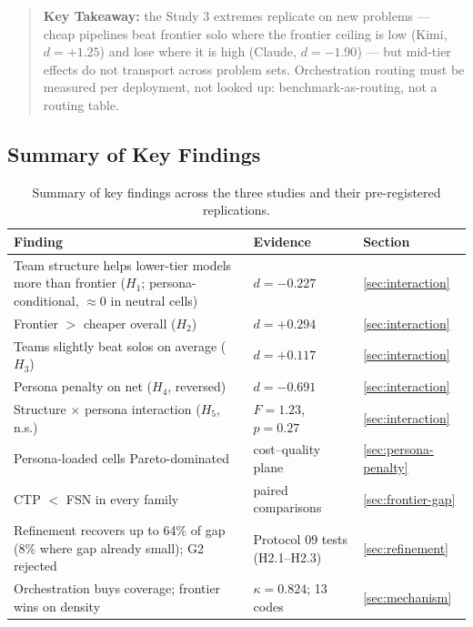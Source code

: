 \documentclass[12pt,a4paper]{article}
\begin{document}
\begin{quote}
\textbf{Key Takeaway:} the Study 3 extremes replicate on new problems ---
cheap pipelines beat frontier solo where the frontier ceiling is low (Kimi,
$d = +1.25$) and lose where it is high (Claude, $d = -1.90$) --- but
mid-tier effects do not transport across problem sets. Orchestration routing
must be measured per deployment, not looked up: benchmark-as-routing, not a
routing table.
\end{quote}

\subsection{Summary of Key Findings}

\begin{table}[ht]
  \centering
  \footnotesize
  \caption{Summary of key findings across the three studies and their
  pre-registered replications.}
  \label{tab:summary-findings}
  \begin{tabular}{@{}>{\raggedright\arraybackslash}p{7.6cm} >{\raggedright\arraybackslash}p{4.6cm} >{\raggedright\arraybackslash}p{2.2cm}@{}}
    \toprule
    \textbf{Finding} & \textbf{Evidence} & \textbf{Section} \\
    \midrule
    Team structure helps lower-tier models more than frontier ($H_1$; persona-conditional, $\approx 0$ in neutral cells) & $d = -0.227$ & \cref{sec:interaction} \\
    Frontier $>$ cheaper overall ($H_2$) & $d = +0.294$ & \cref{sec:interaction} \\
    Teams slightly beat solos on average ($H_3$) & $d = +0.117$ & \cref{sec:interaction} \\
    Persona penalty on net ($H_4$, reversed) & $d = -0.691$ & \cref{sec:interaction} \\
    Structure $\times$ persona interaction ($H_5$, n.s.) & $F = 1.23$, $p = 0.27$ & \cref{sec:interaction} \\
    Persona-loaded cells Pareto-dominated & cost--quality plane & \cref{sec:persona-penalty} \\
    CTP $<$ FSN in every family & paired comparisons & \cref{sec:frontier-gap} \\
    Refinement recovers up to 64\% of gap (8\% where gap already small); G2 rejected & Protocol 09 tests (H2.1--H2.3) & \cref{sec:refinement} \\
    Orchestration buys coverage; frontier wins on density & $\kappa = 0.824$; 13 codes & \cref{sec:mechanism} \\

\end{tabular}
\end{table}
\end{document}

